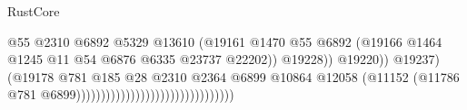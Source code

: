 \begin{lexlean}{RustCore}
\begin{coremodule}
                                                                        @55
                                                                        @2310
                                                                        @6892
                                                                        @5329
                                                                        @13610
                                                                        (@19161
                                                                          @1470
                                                                          @55
                                                                          @6892
                                                                          (@19166
                                                                            @1464
                                                                            @1245
                                                                            @11
                                                                            @54
                                                                            @6876
                                                                            @6335
                                                                            @23737
                                                                            @22202))
                                                                        @19228))
                                                                    @19220))
                                                                @19237)
                                                              (@19178
                                                                @781
                                                                @185
                                                                @28
                                                                @2310
                                                                @2364
                                                                @6899
                                                                @10864
                                                                @12058
                                                                (@11152
                                                                  (@11786
                                                                    @781
                                                                    @6899))))))))))))))))))))))))))))))))

\end{coremodule}
\end{lexlean}
